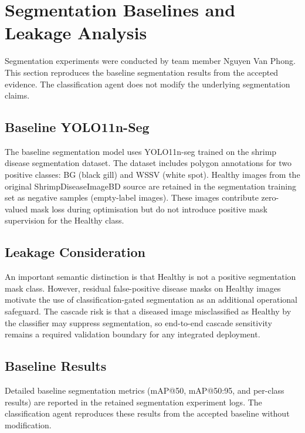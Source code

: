 
\section{Segmentation Baselines and Leakage Analysis}
\label{sec:segmentation-baselines}

Segmentation experiments were conducted by team member Nguyen Van Phong. This section reproduces the baseline segmentation results from the accepted evidence. The classification agent does not modify the underlying segmentation claims.

\subsection{Baseline YOLO11n-Seg}
\label{sec:yolo11n-seg}

The baseline segmentation model uses YOLO11n-seg trained on the shrimp disease segmentation dataset. The dataset includes polygon annotations for two positive classes: BG (black gill) and WSSV (white spot). Healthy images from the original ShrimpDiseaseImageBD source are retained in the segmentation training set as negative samples (empty-label images). These images contribute zero-valued mask loss during optimisation but do not introduce positive mask supervision for the Healthy class.

\subsection{Leakage Consideration}
\label{sec:segmentation-leakage}

An important semantic distinction is that Healthy is not a positive segmentation mask class. However, residual false-positive disease masks on Healthy images motivate the use of classification-gated segmentation as an additional operational safeguard. The cascade risk is that a diseased image misclassified as Healthy by the classifier may suppress segmentation, so end-to-end cascade sensitivity remains a required validation boundary for any integrated deployment.

\subsection{Baseline Results}
\label{sec:segmentation-baseline-results}

Detailed baseline segmentation metrics (mAP@50, mAP@50:95, and per-class results) are reported in the retained segmentation experiment logs. The classification agent reproduces these results from the accepted baseline without modification.